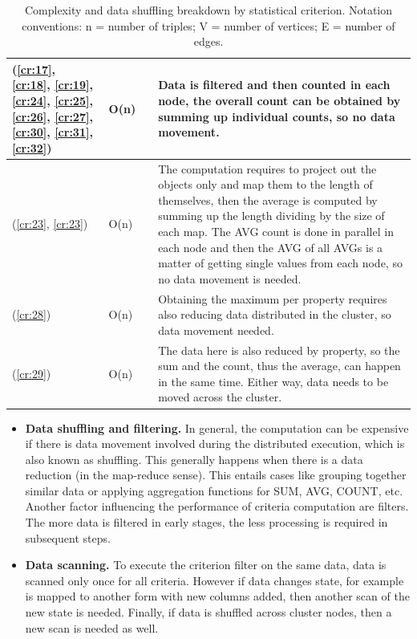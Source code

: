 \begin{table}[t]
\begin{tabularx}{\linewidth}{>{\scriptsize}p{1.5cm}|>{\scriptsize}p{3.9cm}>{\scriptsize}p{0.2cm}|>{\scriptsize}p{8.2cm}}
 \\
\hline
   (\ref{cr:17}, \ref{cr:18}, \ref{cr:19}, \ref{cr:24}, \ref{cr:25}, \ref{cr:26}, \ref{cr:27}, \ref{cr:30}, \ref{cr:31}, \ref{cr:32}) & 
  O(n) & & 
  Data is filtered and then counted in each node, the overall count can be obtained by summing up individual counts, so no data movement.
 \\
\hline
  (\ref{cr:23}, \ref{cr:23}) & 
  O(n) & & 
  The computation requires to project out the objects only and map them to the length of themselves, then the average is computed by summing up the length dividing by the size of each map. The AVG count is done in parallel in each node and then the AVG of all AVGs is a matter of getting single values from each node, so no data movement is needed.
 \\
\hline
  (\ref{cr:28}) & 
  O(n) & & 
  Obtaining the maximum per property requires also reducing data distributed in the cluster, so data movement needed.
 \\
\hline
  (\ref{cr:29}) & 
  O(n) & & 
  The data here is also reduced by property, so the sum and the count, thus the average, can happen in the same time. Either way, data needs to be moved across the cluster.
 \\
\hline
\end{tabularx}
\caption{Complexity and data shuffling breakdown by statistical criterion. Notation conventions: n = number of triples; V = number of vertices; E = number of edges.}
\label{tab:criteriacomplexity}
\end{table}

\begin{itemize}
\item \textbf{Data shuffling and filtering.} In general, the computation can be expensive if there is data movement involved during the distributed execution, which is also known as shuffling. 
This generally happens when there is a data reduction (in the map-reduce sense). This entails cases like grouping together similar data or applying aggregation functions for SUM, AVG, COUNT, etc. 
Another factor influencing the performance of criteria computation are filters. The more data is filtered in early stages, the less processing is required in subsequent steps.

\item \textbf{Data scanning.} To execute the criterion filter on the same data, data is scanned only once for all criteria. 
However if data changes state, for example is mapped to another form with new columns added, then another scan of the new state is needed.
Finally, if data is shuffled across cluster nodes, then a new scan is needed as well.  
\end{itemize}

